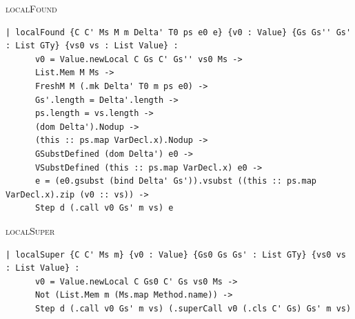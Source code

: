 \begin{cmp}{\textsc{localFound}}
\begin{paperside}
\end{paperside}
\begin{leanside}
\begin{lstlisting}[style=leanside]
  | localFound {C C' Ms M m Delta' T0 ps e0 e} {v0 : Value} {Gs Gs'' Gs' : List GTy} {vs0 vs : List Value} :
      v0 = Value.newLocal C Gs C' Gs'' vs0 Ms ->
      List.Mem M Ms ->
      FreshM M (.mk Delta' T0 m ps e0) ->
      Gs'.length = Delta'.length ->
      ps.length = vs.length ->
      (dom Delta').Nodup ->
      (this :: ps.map VarDecl.x).Nodup ->
      GSubstDefined (dom Delta') e0 ->
      VSubstDefined (this :: ps.map VarDecl.x) e0 ->
      e = (e0.gsubst (bind Delta' Gs')).vsubst ((this :: ps.map VarDecl.x).zip (v0 :: vs)) ->
      Step d (.call v0 Gs' m vs) e
\end{lstlisting}
\end{leanside}
\nomapping
\end{cmp}

\begin{cmp}{\textsc{localSuper}}
\begin{paperside}
\end{paperside}
\begin{leanside}
\begin{lstlisting}[style=leanside]
  | localSuper {C C' Ms m} {v0 : Value} {Gs0 Gs Gs' : List GTy} {vs0 vs : List Value} :
      v0 = Value.newLocal C Gs0 C' Gs vs0 Ms ->
      Not (List.Mem m (Ms.map Method.name)) ->
      Step d (.call v0 Gs' m vs) (.superCall v0 (.cls C' Gs) Gs' m vs)
\end{lstlisting}
\end{leanside}
\nomapping
\end{cmp}

